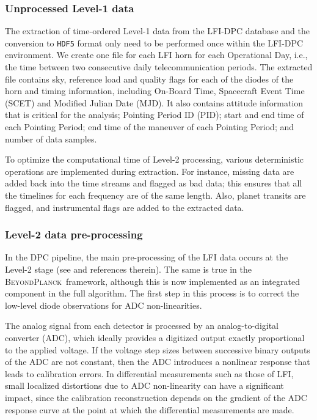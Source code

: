 \documentclass[onecolumn]{aa}
\newcommand{\BP}{\textsc{BeyondPlanck}}
\begin{document}
\subsubsection{Unprocessed Level-1 data}

The extraction of time-ordered Level-1 data from the LFI-DPC database
and the conversion to \texttt{HDF5} format only need to be performed once
within the LFI-DPC environment. We create one file for each LFI horn for
each Operational Day, i.e., the time between two consecutive daily
telecommunication periods. The extracted file contains sky, reference
load and quality flags for each of the diodes of the horn and timing
information, including On-Board Time, Spacecraft Event Time (SCET) and
Modified Julian Date (MJD). It also contains attitude information that
is critical for the analysis; Pointing Period ID (PID); start and end
time of each Pointing Period; end time of the maneuver of each
Pointing Period; and number of data samples.

To optimize the computational time of Level-2 processing, various
deterministic operations are implemented during extraction. For
instance, missing data are added back into the time streams and
flagged as bad data; this ensures that all the timelines for each
frequency are of the same length. Also, planet transits are flagged,
and instrumental flags are added to the extracted data.
		
\subsubsection{Level-2 data pre-processing}

In the DPC pipeline, the main pre-processing of the LFI data occurs at
the Level-2 stage (see \citealp{planck2016-l02} and references
therein).  The same is true in the \BP\ framework, although this is
now implemented as an integrated component in the full algorithm. The
first step in this process is to correct the low-level diode
observations for ADC non-linearities.

The analog signal from each detector is processed by an
analog-to-digital converter (ADC), which ideally provides a digitized
output exactly proportional to the applied voltage.  If the voltage
step sizes between successive binary outputs of the ADC are not
constant, then the ADC introduces a nonlinear response that leads to
calibration errors.  In differential measurements such as those of
LFI, small localized distortions due to ADC non-linearity can have a
significant impact, since the calibration reconstruction depends on
the gradient of the ADC response curve at the point at which the
differential measurements are made.
\end{document}
